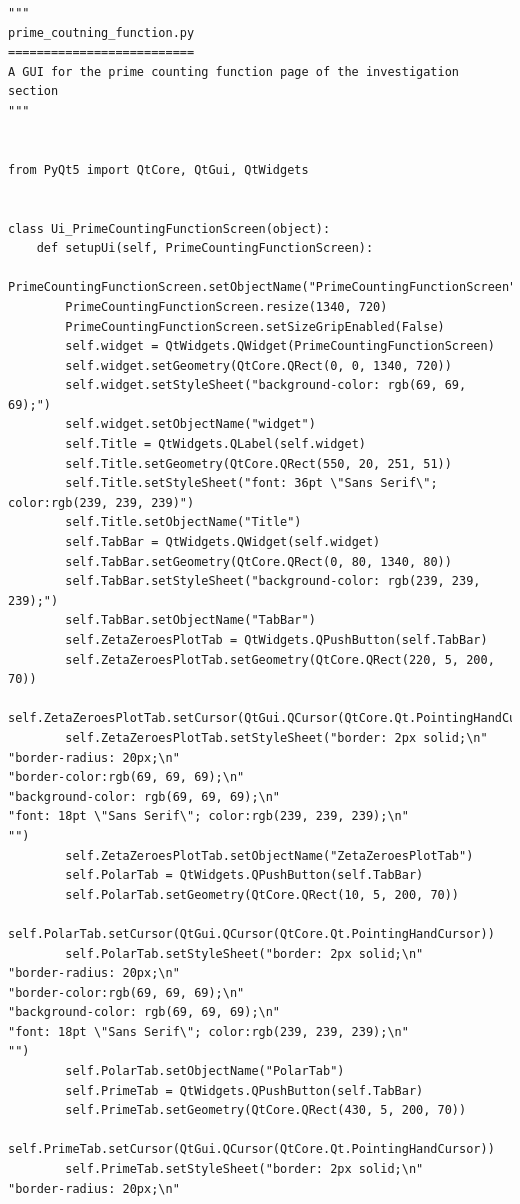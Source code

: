 \documentclass{article}
\begin{document}
\begin{lstlisting}
"""
prime_coutning_function.py
==========================
A GUI for the prime counting function page of the investigation section
"""


from PyQt5 import QtCore, QtGui, QtWidgets


class Ui_PrimeCountingFunctionScreen(object):
    def setupUi(self, PrimeCountingFunctionScreen):
        PrimeCountingFunctionScreen.setObjectName("PrimeCountingFunctionScreen")
        PrimeCountingFunctionScreen.resize(1340, 720)
        PrimeCountingFunctionScreen.setSizeGripEnabled(False)
        self.widget = QtWidgets.QWidget(PrimeCountingFunctionScreen)
        self.widget.setGeometry(QtCore.QRect(0, 0, 1340, 720))
        self.widget.setStyleSheet("background-color: rgb(69, 69, 69);")
        self.widget.setObjectName("widget")
        self.Title = QtWidgets.QLabel(self.widget)
        self.Title.setGeometry(QtCore.QRect(550, 20, 251, 51))
        self.Title.setStyleSheet("font: 36pt \"Sans Serif\"; color:rgb(239, 239, 239)")
        self.Title.setObjectName("Title")
        self.TabBar = QtWidgets.QWidget(self.widget)
        self.TabBar.setGeometry(QtCore.QRect(0, 80, 1340, 80))
        self.TabBar.setStyleSheet("background-color: rgb(239, 239, 239);")
        self.TabBar.setObjectName("TabBar")
        self.ZetaZeroesPlotTab = QtWidgets.QPushButton(self.TabBar)
        self.ZetaZeroesPlotTab.setGeometry(QtCore.QRect(220, 5, 200, 70))
        self.ZetaZeroesPlotTab.setCursor(QtGui.QCursor(QtCore.Qt.PointingHandCursor))
        self.ZetaZeroesPlotTab.setStyleSheet("border: 2px solid;\n"
"border-radius: 20px;\n"
"border-color:rgb(69, 69, 69);\n"
"background-color: rgb(69, 69, 69);\n"
"font: 18pt \"Sans Serif\"; color:rgb(239, 239, 239);\n"
"")
        self.ZetaZeroesPlotTab.setObjectName("ZetaZeroesPlotTab")
        self.PolarTab = QtWidgets.QPushButton(self.TabBar)
        self.PolarTab.setGeometry(QtCore.QRect(10, 5, 200, 70))
        self.PolarTab.setCursor(QtGui.QCursor(QtCore.Qt.PointingHandCursor))
        self.PolarTab.setStyleSheet("border: 2px solid;\n"
"border-radius: 20px;\n"
"border-color:rgb(69, 69, 69);\n"
"background-color: rgb(69, 69, 69);\n"
"font: 18pt \"Sans Serif\"; color:rgb(239, 239, 239);\n"
"")
        self.PolarTab.setObjectName("PolarTab")
        self.PrimeTab = QtWidgets.QPushButton(self.TabBar)
        self.PrimeTab.setGeometry(QtCore.QRect(430, 5, 200, 70))
        self.PrimeTab.setCursor(QtGui.QCursor(QtCore.Qt.PointingHandCursor))
        self.PrimeTab.setStyleSheet("border: 2px solid;\n"
"border-radius: 20px;\n"

\end{lstlisting}
\end{document}
